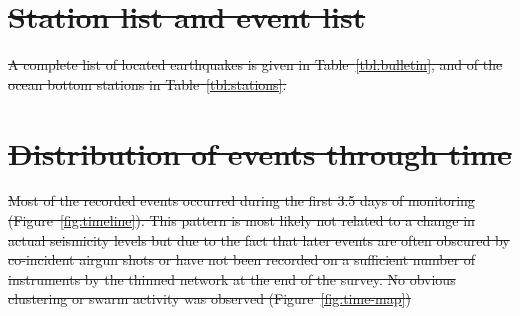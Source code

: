 \documentclass[jgrga]{agu2001} %
\newlength{\tw}
\providecommand{\DIFdel}[1]{{\protect\color{red}\sout{#1}}}                      %
\providecommand{\DIFaddbegin}{} %
\providecommand{\DIFaddend}{} %
\providecommand{\DIFdelbegin}{} %
\providecommand{\DIFdelend}{} %
\begin{document}
\begin{article}
\DIFdelbegin %
\DIFdelend \DIFaddbegin \ignore{%
}
\DIFaddend 

\DIFdelbegin \section{\DIFdel{Station list and event list}}
\addtocounter{section}{-1}%

\DIFdel{A complete list of located earthquakes is given in
Table~\ref{tbl:bulletin}, and of the ocean bottom stations in Table~\ref{tbl:stations}.
}%

\section{\DIFdel{Distribution of events through time}}
\addtocounter{section}{-1}%

\DIFdel{Most of the recorded events occurred during the first 3.5 days of
monitoring (Figure~\ref{fig:timeline}). This pattern is most likely not
related to a change in actual seismicity levels but due to the fact
that later events are often obscured by co-incident airgun shots or
have not been  recorded  on a sufficient number
of instruments by the thinned network at the end of the survey.   No
obvious clustering or swarm activity was observed (Figure~\ref{fig:time-map})
}%


\end{article}
\end{document}
